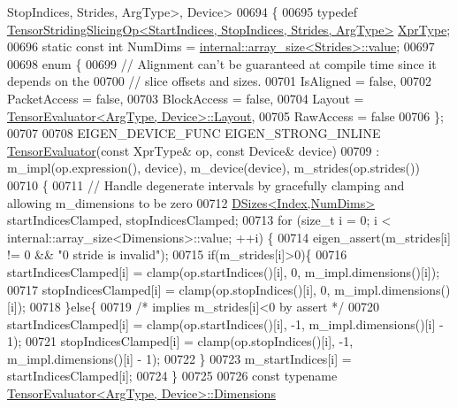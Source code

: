 \begin{DoxyCode}
      StopIndices, Strides, ArgType>, Device>
00694 \{
00695   \textcolor{keyword}{typedef} \hyperlink{class_eigen_1_1_tensor_striding_slicing_op}{TensorStridingSlicingOp<StartIndices, StopIndices, Strides, ArgType>}
       \hyperlink{class_eigen_1_1_tensor_striding_slicing_op}{XprType};
00696   \textcolor{keyword}{static} \textcolor{keyword}{const} \textcolor{keywordtype}{int} NumDims = \hyperlink{struct_eigen_1_1internal_1_1array__size}{internal::array\_size<Strides>::value};
00697 
00698   \textcolor{keyword}{enum} \{
00699     \textcolor{comment}{// Alignment can't be guaranteed at compile time since it depends on the}
00700     \textcolor{comment}{// slice offsets and sizes.}
00701     IsAligned = \textcolor{keyword}{false},
00702     PacketAccess = \textcolor{keyword}{false},
00703     BlockAccess = \textcolor{keyword}{false},
00704     Layout = \hyperlink{struct_eigen_1_1_tensor_evaluator}{TensorEvaluator<ArgType, Device>::Layout},
00705     RawAccess = \textcolor{keyword}{false}
00706   \};
00707 
00708   EIGEN\_DEVICE\_FUNC EIGEN\_STRONG\_INLINE \hyperlink{struct_eigen_1_1_tensor_evaluator}{TensorEvaluator}(\textcolor{keyword}{const} XprType& op, \textcolor{keyword}{const} Device& 
      device)
00709       : m\_impl(op.expression(), device), m\_device(device), m\_strides(op.strides())
00710   \{
00711     \textcolor{comment}{// Handle degenerate intervals by gracefully clamping and allowing m\_dimensions to be zero}
00712     \hyperlink{struct_eigen_1_1_d_sizes}{DSizes<Index,NumDims>} startIndicesClamped, stopIndicesClamped;
00713     \textcolor{keywordflow}{for} (\textcolor{keywordtype}{size\_t} i = 0; i < internal::array\_size<Dimensions>::value; ++i) \{
00714       eigen\_assert(m\_strides[i] != 0 && \textcolor{stringliteral}{"0 stride is invalid"});
00715       \textcolor{keywordflow}{if}(m\_strides[i]>0)\{
00716         startIndicesClamped[i] = clamp(op.startIndices()[i], 0, m\_impl.dimensions()[i]);
00717         stopIndicesClamped[i] = clamp(op.stopIndices()[i], 0, m\_impl.dimensions()[i]);
00718       \}\textcolor{keywordflow}{else}\{
00719         \textcolor{comment}{/* implies m\_strides[i]<0 by assert */}
00720         startIndicesClamped[i] = clamp(op.startIndices()[i], -1, m\_impl.dimensions()[i] - 1);
00721         stopIndicesClamped[i] = clamp(op.stopIndices()[i], -1, m\_impl.dimensions()[i] - 1);
00722       \}
00723       m\_startIndices[i] = startIndicesClamped[i];
00724     \}
00725 
00726     \textcolor{keyword}{const} \textcolor{keyword}{typename} \hyperlink{struct_eigen_1_1_tensor_evaluator}{TensorEvaluator<ArgType, Device>::Dimensions}

\end{DoxyCode}
